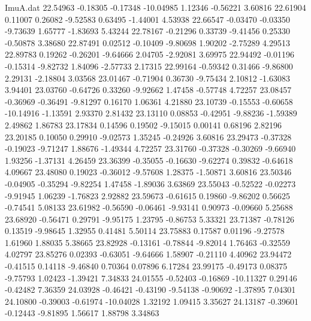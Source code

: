 \begin{filecontents}{ImuA.dat}
  22.54963   -0.18305   -0.17348  -10.04985    1.12346   -0.56221    3.60816
  22.61904    0.11007    0.26082   -9.52583    0.63495   -1.44001    4.53938
  22.66547   -0.03470   -0.03350   -9.73639    1.65777   -1.83693    5.43244
  22.78167   -0.21296    0.33739   -9.41456    0.25330   -0.50878    3.38680
  22.87491    0.02512   -0.10409   -9.80698    1.90202   -2.75289    4.29513
  22.89783    0.19262   -0.26201   -9.64666    2.04705   -2.92081    3.69975
  22.94492   -0.01196   -0.15314   -9.82732    1.84096   -2.57733    2.17315
  22.99164   -0.59342    0.31466   -9.86800    2.29131   -2.18804    3.03568
  23.01467   -0.71904    0.36730   -9.75434    2.10812   -1.63083    3.94401
  23.03760   -0.64726    0.33260   -9.92662    1.47458   -0.57748    4.72257
  23.08457   -0.36969   -0.36491   -9.81297    0.16170    1.06361    4.21880
  23.10739   -0.15553   -0.60658  -10.14916   -1.13591    2.93370    2.81432
  23.13110    0.08853   -0.42951   -9.88236   -1.59389    2.49862    1.86783
  23.17834    0.14596    0.19502   -9.15015    0.00141    0.68196    2.82196
  23.20185    0.10050    0.29910   -9.02573    1.35245   -0.24926    3.60816
  23.29473   -0.37328   -0.19023   -9.71247    1.88676   -1.49344    4.72257
  23.31760   -0.37328   -0.30269   -9.66940    1.93256   -1.37131    4.26459
  23.36399   -0.35055   -0.16630   -9.62274    0.39832   -0.64618    4.09667
  23.48080    0.19023   -0.36012   -9.57608    1.28375   -1.50871    3.60816
  23.50346   -0.04905   -0.35294   -9.82254    1.47458   -1.89036    3.63869
  23.55043   -0.52522   -0.02273   -9.91945    1.06239   -1.76823    2.92882
  23.59673   -0.61615    0.19860   -9.86202    0.56625   -0.74541    5.08133
  23.61982   -0.56590   -0.06461   -9.93141    0.90973   -0.09660    5.25688
  23.68920   -0.56471    0.29791   -9.95175    1.23795   -0.86753    5.33321
  23.71387   -0.78126    0.13519   -9.98645    1.32955    0.41481    5.50114
  23.75883    0.17587    0.01196   -9.27578    1.61960    1.88035    5.38665
  23.82928   -0.13161   -0.78844   -9.82014    1.76463   -0.32559    4.02797
  23.85276    0.02393   -0.63051   -9.64666    1.58907   -0.21110    4.40962
  23.94472   -0.41515    0.14118   -9.46840    0.70364    0.07896    6.17284
  23.99175   -0.49173    0.08375   -9.75793    1.02423   -1.39421    7.34833
  24.01555   -0.52403   -0.16869  -10.11327    0.29146   -0.42482    7.36359
  24.03928   -0.46421   -0.43190   -9.54138   -0.90692   -1.37895    7.04301
  24.10800   -0.39003   -0.61974  -10.04028    1.32192    1.09415    3.35627
  24.13187   -0.39601   -0.12443   -9.81895    1.56617    1.88798    3.34863

\end{filecontents}
